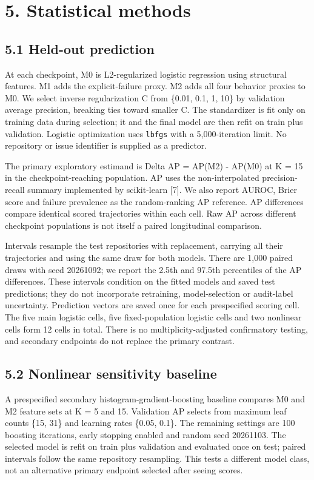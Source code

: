 \documentclass[10pt,a4paper]{article}
\begin{document}
\section{5. Statistical methods}
\subsection{5.1 Held-out prediction}
At each checkpoint, M0 is L2-regularized logistic regression using structural features. M1 adds the explicit-failure proxy. M2 adds all four behavior proxies to M0. We select inverse regularization C from \{0.01, 0.1, 1, 10\} by validation average precision, breaking ties toward smaller C. The standardizer is fit only on training data during selection; it and the final model are then refit on train plus validation. Logistic optimization uses \texttt{lbfgs} with a 5,000-iteration limit. No repository or issue identifier is supplied as a predictor.

The primary exploratory estimand is Delta AP = AP(M2) - AP(M0) at K = 15 in the checkpoint-reaching population. AP uses the non-interpolated precision-recall summary implemented by scikit-learn [7]. We also report AUROC, Brier score and failure prevalence as the random-ranking AP reference. AP differences compare identical scored trajectories within each cell. Raw AP across different checkpoint populations is not itself a paired longitudinal comparison.

Intervals resample the test repositories with replacement, carrying all their trajectories and using the same draw for both models. There are 1,000 paired draws with seed 20261092; we report the 2.5th and 97.5th percentiles of the AP differences. These intervals condition on the fitted models and saved test predictions; they do not incorporate retraining, model-selection or audit-label uncertainty. Prediction vectors are saved once for each prespecified scoring cell. The five main logistic cells, five fixed-population logistic cells and two nonlinear cells form 12 cells in total. There is no multiplicity-adjusted confirmatory testing, and secondary endpoints do not replace the primary contrast.

\subsection{5.2 Nonlinear sensitivity baseline}
A prespecified secondary histogram-gradient-boosting baseline compares M0 and M2 feature sets at K = 5 and 15. Validation AP selects from maximum leaf counts \{15, 31\} and learning rates \{0.05, 0.1\}. The remaining settings are 100 boosting iterations, early stopping enabled and random seed 20261103. The selected model is refit on train plus validation and evaluated once on test; paired intervals follow the same repository resampling. This tests a different model class, not an alternative primary endpoint selected after seeing scores.
\end{document}
